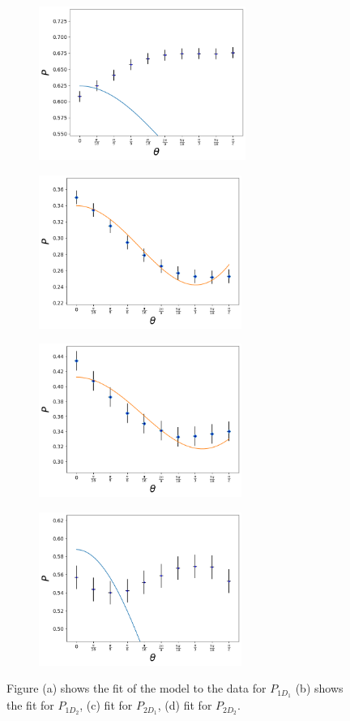 \documentclass[12pt]{book}
\begin{document}
\begin{figure}[t!]
\centering
\begin{subfigure}[b]{0.45\linewidth}
\includegraphics[width=\linewidth,height=5cm]{images/ajuste_miercoles_11.png}
\caption{}
\end{subfigure}
\begin{subfigure}[b]{0.45\linewidth}
\includegraphics[width=\linewidth,height=5cm]{images/ajuste_miercoles_21.png}
\caption{}
\end{subfigure}
\begin{subfigure}[b]{0.45\linewidth}
\includegraphics[width=\linewidth,height=5cm]{images/ajuste_miercoles_12.png}
\caption{}
\end{subfigure}
\begin{subfigure}[b]{0.45\linewidth}
\includegraphics[width=\linewidth,height=5cm]{images/ajuste_miercoles_22.png}
\caption{}
\end{subfigure}
\caption{Figure (a) shows the fit of the model to the data for $P_{1D_{1}}$ (b) shows the fit for $P_{1D_{2}}$, (c) fit for $P_{2D_{1}}$, (d) fit for $P_{2D_{2}}$.}
\label{ajustes}
\end{figure}
\end{document}
